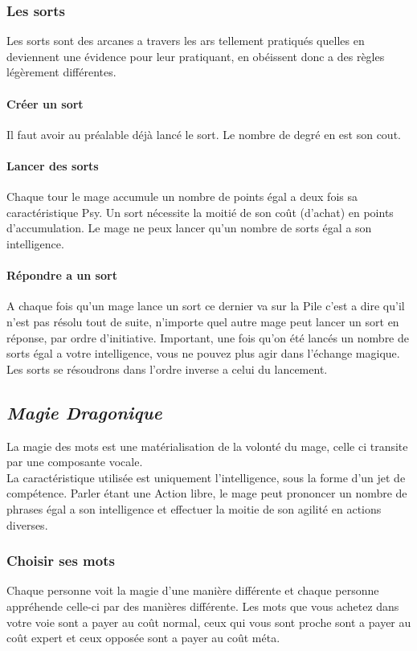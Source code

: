\subsubsection{Les sorts}
Les sorts sont des arcanes a travers les ars tellement pratiqués quelles en deviennent une évidence pour leur pratiquant, en obéissent donc a des règles légèrement différentes.
\paragraph{Créer un sort}
Il faut avoir au préalable déjà lancé le sort. Le nombre de degré en est son cout.
\paragraph{Lancer des sorts}
Chaque tour le mage accumule un nombre de points égal a deux fois sa caractéristique Psy. 
Un sort nécessite la moitié de son coût (d’achat) en points d’accumulation. 
Le mage ne peux lancer qu’un nombre de sorts égal a son intelligence.

\paragraph{Répondre a un sort}
A chaque fois qu’un mage lance un sort ce dernier va sur la Pile c’est a dire qu’il n’est pas résolu tout de suite, 
n'importe quel autre mage peut lancer un sort en réponse, par ordre d’initiative.
Important, une fois qu’on été lancés un nombre de sorts égal a votre intelligence, vous ne pouvez plus agir dans l'échange magique.
Les sorts se résoudrons dans l’ordre inverse a celui du lancement.



\subsection{\em Magie Dragonique}
La magie des mots est une matérialisation de la volonté du mage, celle ci transite par une composante vocale.\\
La caractéristique utilisée est uniquement l'intelligence, sous la forme d’un jet de compétence. 
Parler étant une Action libre, le mage peut prononcer un nombre de phrases égal a son intelligence et effectuer la moitie de son agilité en actions diverses.
\subsubsection{Choisir ses mots}
Chaque personne voit la magie d’une manière différente et chaque personne appréhende celle-ci par des manières différente.
Les mots que vous achetez dans votre voie sont a payer au coût normal, 
ceux qui vous sont proche sont a payer au coût expert et ceux opposée sont a payer au coût méta.

